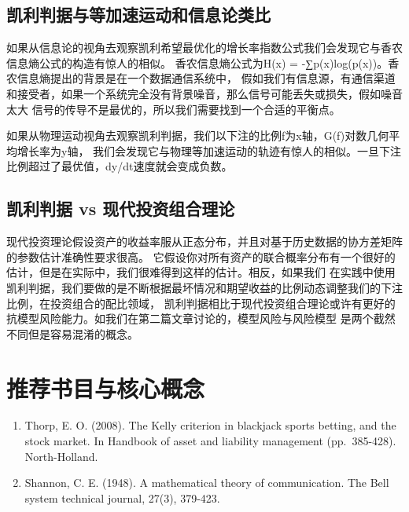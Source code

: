 \documentclass[
  oneside]{book}
\providecommand{\tightlist}{%
  \setlength{\itemsep}{0pt}\setlength{\parskip}{0pt}}
\begin{document}
\hypertarget{ux51efux5229ux5224ux636eux4e0eux7b49ux52a0ux901fux8fd0ux52a8ux548cux4fe1ux606fux8bbaux7c7bux6bd4}{%
\subsection{凯利判据与等加速运动和信息论类比}\label{ux51efux5229ux5224ux636eux4e0eux7b49ux52a0ux901fux8fd0ux52a8ux548cux4fe1ux606fux8bbaux7c7bux6bd4}}

如果从信息论的视角去观察凯利希望最优化的增长率指数公式我们会发现它与香农信息熵公式的构造有惊人的相似。
香农信息熵公式为H(x) = -∑p(x)log(p(x))。香农信息熵提出的背景是在一个数据通信系统中，
假如我们有信息源，有通信渠道和接受者，如果一个系统完全没有背景噪音，那么信号可能丢失或损失，假如噪音太大
信号的传导不是最优的，所以我们需要找到一个合适的平衡点。

如果从物理运动视角去观察凯利判据，我们以下注的比例f为x轴，G(f)对数几何平均增长率为y轴，
我们会发现它与物理等加速运动的轨迹有惊人的相似。一旦下注比例超过了最优值，dy/dt速度就会变成负数。

\hypertarget{ux51efux5229ux5224ux636e-vs-ux73b0ux4ee3ux6295ux8d44ux7ec4ux5408ux7406ux8bba}{%
\subsection{凯利判据 vs 现代投资组合理论}\label{ux51efux5229ux5224ux636e-vs-ux73b0ux4ee3ux6295ux8d44ux7ec4ux5408ux7406ux8bba}}

现代投资理论假设资产的收益率服从正态分布，并且对基于历史数据的协方差矩阵的参数估计准确性要求很高。
它假设你对所有资产的联合概率分布有一个很好的估计，但是在实际中，我们很难得到这样的估计。相反，如果我们
在实践中使用凯利判据，我们要做的是不断根据最坏情况和期望收益的比例动态调整我们的下注比例，在投资组合的配比领域，
凯利判据相比于现代投资组合理论或许有更好的抗模型风险能力。如我们在第二篇文章讨论的，模型风险与风险模型
是两个截然不同但是容易混淆的概念。

\hypertarget{ux63a8ux8350ux4e66ux76eeux4e0eux6838ux5fc3ux6982ux5ff5-1}{%
\section{推荐书目与核心概念}\label{ux63a8ux8350ux4e66ux76eeux4e0eux6838ux5fc3ux6982ux5ff5-1}}

\begin{enumerate}
\def\labelenumi{\arabic{enumi}.}
\tightlist
\item
  Thorp, E. O. (2008). The Kelly criterion in blackjack sports betting, and the stock market. In Handbook of asset and liability management (pp.~385-428). North-Holland.
\item
  Shannon, C. E. (1948). A mathematical theory of communication. The Bell system technical journal, 27(3), 379-423.
\end{enumerate}

\printbibliography
\end{document}
